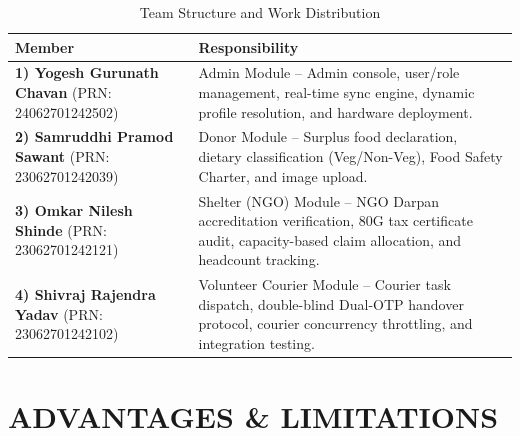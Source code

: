 \documentclass[12pt,a4paper]{article}
\begin{document}
\begin{table}[H]
\centering
\caption{Team Structure and Work Distribution}
\label{tab:team_dist}
\begin{tabularx}{\textwidth}{|p{}|X|}
    \hline
    \textbf{Member} & \textbf{Responsibility} \\
    \hline
    \textbf{1) Yogesh Gurunath Chavan} \newline \footnotesize (PRN: 24062701242502) & Admin Module -- Admin console, user/role management, real-time sync engine, dynamic profile resolution, and hardware deployment. \\
    \hline
    \textbf{2) Samruddhi Pramod Sawant} \newline \footnotesize (PRN: 23062701242039) & Donor Module -- Surplus food declaration, dietary classification (Veg/Non-Veg), Food Safety Charter, and image upload. \\
    \hline
    \textbf{3) Omkar Nilesh Shinde} \newline \footnotesize (PRN: 23062701242121) & Shelter (NGO) Module -- NGO Darpan accreditation verification, 80G tax certificate audit, capacity-based claim allocation, and headcount tracking. \\
    \hline
    \textbf{4) Shivraj Rajendra Yadav} \newline \footnotesize (PRN: 23062701242102) & Volunteer Courier Module -- Courier task dispatch, double-blind Dual-OTP handover protocol, courier concurrency throttling, and integration testing. \\
    \hline
\end{tabularx}
\end{table}

\newpage
\section{ADVANTAGES \& LIMITATIONS}
\end{document}
